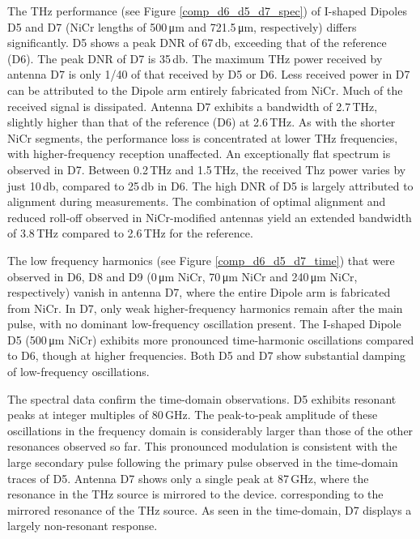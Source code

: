 The THz performance (see Figure \ref{comp_d6_d5_d7_spec}) of I-shaped Dipoles D5 and D7 (NiCr lengths of \num{500}\,\si{\micro \meter} and \num{721.5}\,\si{\micro \meter}, respectively) differs significantly. D5 shows a peak DNR of \num{67}\,\si{\decibel}, exceeding that of the reference (D6). The peak DNR of D7 is \num{35}\,\si{\decibel}. The maximum THz power received by antenna D7 is only \num{1}/\num{40} of that received by D5 or D6. Less received power in D7 can be attributed to the Dipole arm entirely fabricated from NiCr. Much of the received signal is dissipated. Antenna D7 exhibits a bandwidth of \num{2.7}\,\si{\tera \hertz}, slightly higher than that of the reference (D6) at \num{2.6}\,\si{\tera \hertz}. As with the shorter NiCr segments, the performance loss is concentrated at lower THz frequencies, with higher-frequency reception unaffected. An exceptionally flat spectrum is observed in D7. Between \num{0.2}\,\si{\tera \hertz} and \num{1.5}\,\si{\tera \hertz}, the received Thz power varies by just \num{10}\,\si{\decibel}, compared to \num{25}\,\si{\decibel} in D6. The high DNR of D5 is largely attributed to alignment during measurements. The combination of optimal alignment and reduced roll-off observed in NiCr-modified antennas yield an extended bandwidth of \num{3.8}\,\si{\tera \hertz} compared to \num{2.6}\,\si{\tera \hertz} for the reference. 

The low frequency harmonics (see Figure \ref{comp_d6_d5_d7_time}) that were observed in D6, D8 and D9 (\num{0}\,\si{\micro \meter} NiCr, \num{70}\,\si{\micro \meter} NiCr and \num{240}\,\si{\micro \meter} NiCr, respectively) vanish in antenna D7, where the entire Dipole arm is fabricated from NiCr. In D7, only weak higher-frequency harmonics remain after the main pulse, with no dominant low-frequency oscillation present. The I-shaped Dipole D5 (\num{500}\,\si{\micro \meter} NiCr) exhibits more pronounced time-harmonic oscillations compared to D6, though at higher frequencies. Both D5 and D7 show substantial damping of low-frequency oscillations.

The spectral data confirm the time-domain observations. D5 exhibits resonant peaks at integer multiples of \num{80}\,\si{\giga \hertz}. The peak-to-peak amplitude of these oscillations in the frequency domain is considerably larger than those of the other resonances observed so far. This pronounced modulation is consistent with the large secondary pulse following the primary pulse observed in the time-domain traces of D5. Antenna D7 shows only a single peak at \num{87}\,\si{\giga \hertz}, where the resonance in the THz source is mirrored to the device. corresponding to the mirrored resonance of the THz source. As seen in the time-domain, D7 displays a largely non-resonant response.

